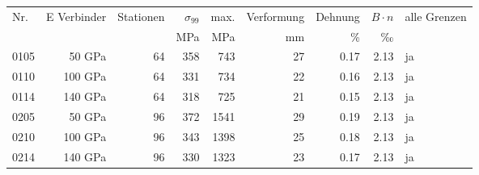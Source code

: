 \begin{tabular}{@{}lrrrrrrrl@{}}\toprule
Nr. & E Verbinder & Stationen & $\sigma_{99}$ & max. & Verformung & Dehnung & $B\cdot n$ & alle Grenzen \\
 & & & MPa & MPa & mm & \% & ‰ & \\\midrule
0105 & 50 GPa & 64 & \num{358} & \num{743} & \num{27} & \num{0.17} & \num{2.13} & ja \\
0110 & 100 GPa & 64 & \num{331} & \num{734} & \num{22} & \num{0.16} & \num{2.13} & ja \\
0114 & 140 GPa & 64 & \num{318} & \num{725} & \num{21} & \num{0.15} & \num{2.13} & ja \\
0205 & 50 GPa & 96 & \num{372} & \num{1541} & \num{29} & \num{0.19} & \num{2.13} & ja \\
0210 & 100 GPa & 96 & \num{343} & \num{1398} & \num{25} & \num{0.18} & \num{2.13} & ja \\
0214 & 140 GPa & 96 & \num{330} & \num{1323} & \num{23} & \num{0.17} & \num{2.13} & ja \\
\bottomrule\end{tabular}
